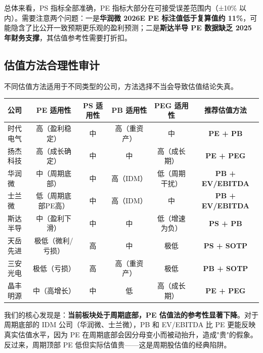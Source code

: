 总体来看，PS 指标全部准确，PE 指标大部分在可接受误差范围内（±10\% 以内）。需要注意两个问题：一是\textbf{华润微 2026E PE 标注值低于复算值约 11\%}，可能隐含了比公开一致预期更乐观的盈利预测；二是\textbf{斯达半导 PE 数据缺乏 2025 年财务支撑}，其估值参考性需要打折扣。

\subsection{估值方法合理性审计}

不同估值方法适用于不同类型的公司，方法选择不当会导致估值结论失真。

\begin{exhibitbox}[表 7-10：各公司估值方法适用性评估]
\centering
\small
\begin{tabularx}{\textwidth}{l c c c c c}
\toprule
\textbf{公司} & \textbf{PE 适用性} & \textbf{PS 适用性} & \textbf{PB 适用性} & \textbf{PEG 适用性} & \textbf{推荐估值方法} \\
\midrule
\rowcolor{riskgreen!10}
时代电气 & 高（盈利稳定） & 中 & 高（重资产） & 中 & \textbf{PE + PB} \\
\rowcolor{riskgreen!10}
扬杰科技 & 高（成长确定） & 中 & 中 & 高（成长期） & \textbf{PE + PEG} \\
\rowcolor{riskamber!10}
华润微 & 中（周期底部） & 中 & 高（IDM） & 低（周期干扰） & \textbf{PB + EV/EBITDA} \\
\rowcolor{riskamber!10}
士兰微 & 低（周期底部PE高） & 中 & 高（IDM） & 中 & \textbf{PB + EV/EBITDA} \\
\rowcolor{riskamber!10}
斯达半导 & 中（盈利下滑） & 中 & 中 & 低（增速为负） & \textbf{PS + PB} \\
\rowcolor{riskred!10}
天岳先进 & 极低（微利/亏损） & 高 & 中 & 极低 & \textbf{PS + SOTP} \\
\rowcolor{riskred!10}
三安光电 & 极低（亏损） & 高 & 高（重资产） & 极低 & \textbf{PB + SOTP} \\
\rowcolor{riskamber!10}
晶丰明源 & 中（高增长） & 中 & 低 & 高（成长期） & \textbf{PE + PEG} \\
\bottomrule
\end{tabularx}
\end{exhibitbox}

我们的核心发现是：\textbf{当前板块处于周期底部，PE 估值法的参考性显著下降}。对于周期底部的 IDM 公司（华润微、士兰微），PB 和 EV/EBITDA 比 PE 更能反映真实估值水平，因为 PE 在周期底部会因分母变小而被动抬升，造成"贵"的假象。反过来，周期顶部 PE 低但实际估值贵——这是周期股估值的经典陷阱。

